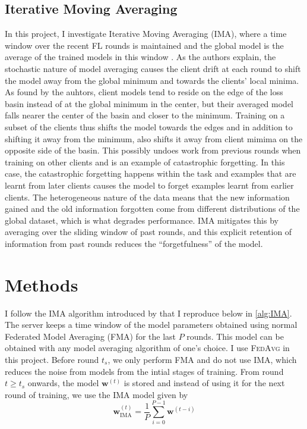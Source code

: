 \documentclass{article}
\newcommand*{\fedavg}{\textsc{FedAvg}}
\begin{document}
\subsection{Iterative Moving Averaging}
In this project, I investigate Iterative Moving Averaging (IMA), where a time window over the recent FL rounds is maintained and the global model is the average of the trained models in this window \cite{zhouUnderstandingImprovingModel2023}. As the authors explain, the stochastic nature of model averaging causes the client drift at each round to shift the model away from the global minimum and towards the clients' local minima.
As found by the auhtors, client models tend to reside on the edge of the loss basin instead of at the global minimum in the center, but their averaged model falls nearer the center of the basin and closer to the minimum. Training on a subset of the clients thus shifts the model towards the edges and in addition to shifting it away from the minimum, also shifts it away from client mimima on the opposite side of the basin. This possibly undoes work from previous rounds when training on other clients and is an example of catastrophic forgetting. In this case, the catastrophic forgetting happens within the task and examples that are learnt from later clients causes the model to forget examples learnt from earlier clients. The heterogeneous nature of the data means that the new information gained and the old information forgotten come from different distributions of the global dataset, which is what degrades performance. IMA mitigates this by averaging over the sliding window of past rounds, and this explicit retention of information from past rounds reduces the ``forgetfulness'' of the model.


\section{Methods}
I follow the IMA algorithm introduced by \citet{zhouUnderstandingImprovingModel2023} that I reproduce below in \cref{alg:IMA}. The server keeps a time window of the model parameters obtained using normal Federated Model Averaging (FMA) for the last $P$ rounds. This model can be obtained with any model averaging algorithm of one's choice. I use \fedavg{} in this project. Before round $t_s$, we only perform FMA and do not use IMA, which reduces the noise from models from the intial stages of training. From round $t\geq t_s$ onwards, the model $\mathbf{w}^{(t)}$ is stored and instead of using it for the next round of training, we use the IMA model given by
\[\mathbf{w}^{(t)}_{\mathrm{IMA}} = \frac{1}{P}\sum_{i=0}^{P-1}\mathbf{w}^{(t-i)}\]
\end{document}
